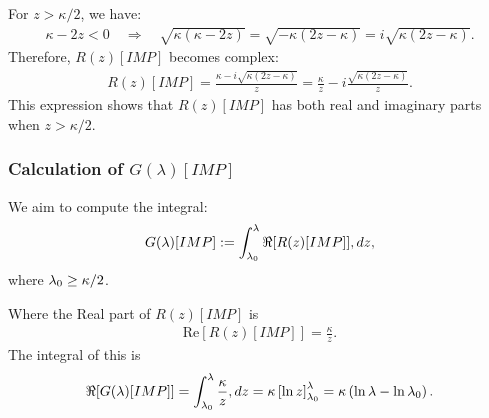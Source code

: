 For $z > \kappa/2$, we have:
\begin{align}
\kappa - 2z < 0 \quad \Rightarrow \quad \sqrt{\kappa(\kappa - 2z)} = \sqrt{-\kappa(2z - \kappa)} = i \sqrt{\kappa(2z - \kappa)}.
\end{align}
%
Therefore, $R(z)[IMP]$ becomes complex:
\begin{align}
R(z)[IMP] = \frac{\kappa - i \sqrt{\kappa(2z - \kappa)}}{z} = \frac{\kappa}{z} - i \frac{ \sqrt{ \kappa(2z - \kappa) } }{ z }.
\end{align}
%
This expression shows that $R(z)[IMP]$ has both real and imaginary parts when $z > \kappa/2$.

\subsubsection{Calculation of \texorpdfstring{$G(\lambda)[IMP]$}{G(lambda)[IMP]}}

We aim to compute the integral:
\begin{align}
G(\lambda)[IMP] := \int_{\lambda_{0}}^\lambda \Re[R(z)[IMP]] , dz,
\end{align}
where $\lambda_{0} \geq \kappa/2$.

Where the Real part of $R(z)[IMP]$ is
\begin{align}
\text{Re}[R(z)[IMP]] = \frac{\kappa}{z}.
\end{align}
%
The integral of this is
\begin{align}
\Re[G(\lambda)[IMP]] = \int_{\lambda_{0}}^\lambda \frac{\kappa}{z} , dz = \kappa \left[ \ln z \right]_{\lambda_{0}}^\lambda = \kappa \left( \ln \lambda - \ln \lambda_{0} \right).
\end{align}




